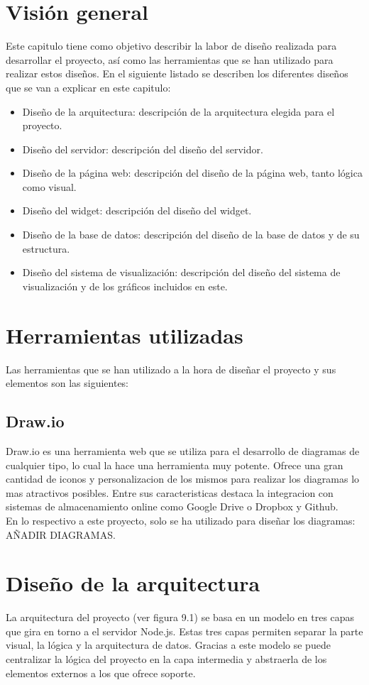 \section{Visión general}
Este capitulo tiene como objetivo describir la labor de diseño realizada para desarrollar el proyecto, así como las herramientas que se han utilizado para realizar estos diseños. En el siguiente listado se describen los diferentes diseños que se van a explicar en este capitulo:

\begin{itemize}
	\item Diseño de la arquitectura: descripción de la arquitectura elegida para el proyecto.
	\item Diseño del servidor: descripción del diseño del servidor.
	\item Diseño de la página web: descripción del diseño de la página web, tanto lógica como visual.
	\item Diseño del widget: descripción del diseño del widget.
	\item Diseño de la base de datos: descripción del diseño de la base de datos y de su estructura.
	\item Diseño del sistema de visualización: descripción del diseño del sistema de visualización y de los gráficos incluidos en este.
\end{itemize}

\section{Herramientas utilizadas}
Las herramientas que se han utilizado a la hora de diseñar el proyecto y sus elementos son las siguientes:

\subsection{Draw.io}
Draw.io es una herramienta web que se utiliza para el desarrollo de diagramas de cualquier tipo, lo cual la hace una herramienta muy potente. Ofrece una gran cantidad de iconos y personalizacion de los mismos para realizar los diagramas lo mas atractivos posibles. Entre sus caracteristicas destaca la integracion con sistemas de almacenamiento online como Google Drive o Dropbox y Github.\\

En lo respectivo a este proyecto, solo se ha utilizado para diseñar los diagramas: AÑADIR DIAGRAMAS.

\section{Diseño de la arquitectura}
La arquitectura del proyecto (ver figura 9.1) se basa en un modelo en tres capas que gira en torno a el servidor Node.js. Estas tres capas permiten separar la parte visual, la lógica y la arquitectura de datos. Gracias a este modelo se puede centralizar la lógica del proyecto en la capa intermedia y abstraerla de los elementos externos a los que ofrece soporte.\\

